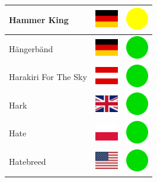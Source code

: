 \documentclass[12pt, a4paper, twoside]{report}
\begin{document}
\begin{center}
\begin{longtable}{|p{5cm}|p{2cm}|p{2cm}|}
Hammer King & \includegraphics[width=1cm]{4x3/de} & \includegraphics[width=1cm]{likes/m} \\ \hline
Hängerbänd & \includegraphics[width=1cm]{4x3/de} & \includegraphics[width=1cm]{likes/y} \\ \hline
Harakiri For The Sky & \includegraphics[width=1cm]{4x3/at} & \includegraphics[width=1cm]{likes/y} \\ \hline
Hark & \includegraphics[width=1cm]{4x3/gb} & \includegraphics[width=1cm]{likes/y} \\ \hline
Hate & \includegraphics[width=1cm]{4x3/pl} & \includegraphics[width=1cm]{likes/y} \\ \hline
Hatebreed & \includegraphics[width=1cm]{4x3/us} & \includegraphics[width=1cm]{likes/y} \\ \hline

\end{longtable}
\end{center}
\end{document}
